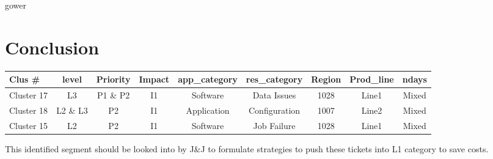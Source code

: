 \documentclass{article}
\begin{document}
gower \\

\section{Conclusion}

\begin{table}[!h]
\begin{tabular}{|l|c|c|c|c|c|c|c|c|}
\hline
Clus \# &    level  &  Priority & Impact & app\_category & res\_category & Region & Prod\_line & ndays \\
\hline
Cluster 17  &       L3           & P1 \& P2  &    I1   & Software   &  Data Issues     &   1028  &   Line1 & Mixed \\
Cluster 18  &       L2 \& L3  &  P2          &    I1   & Application &  Configuration  &   1007  &   Line2 & Mixed \\
Cluster 15  &       L2           & P2           &    I1  & Software    &  Job Failure      &   1028  &   Line1 & Mixed \\
\hline
\end{tabular}
\label{tab_clus}
\end{table}



This identified segment should be looked into by J\&J to formulate strategies to push these tickets
into L1 category to save costs.





\begin{comment}
\end{comment}
\end{document}
